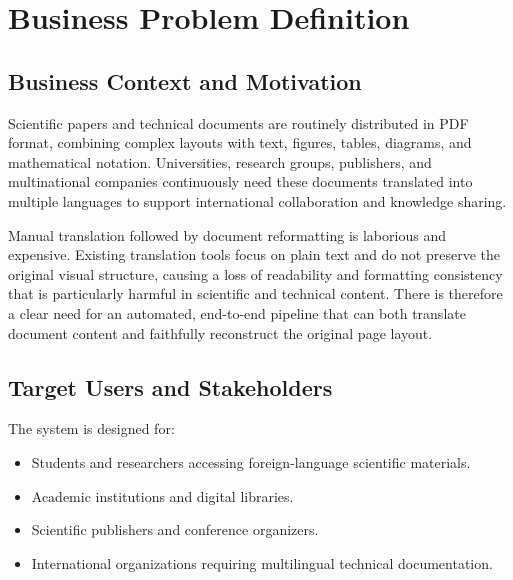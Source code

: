 \documentclass[12pt,a4paper]{article}
\begin{document}
\tableofcontents
\newpage

\section{Business Problem Definition}

\subsection{Business Context and Motivation}

Scientific papers and technical documents are routinely distributed in PDF format, combining complex layouts with text, figures, tables, diagrams, and mathematical notation. Universities, research groups, publishers, and multinational companies continuously need these documents translated into multiple languages to support international collaboration and knowledge sharing.

Manual translation followed by document reformatting is laborious and expensive. Existing translation tools focus on plain text and do not preserve the original visual structure, causing a loss of readability and formatting consistency that is particularly harmful in scientific and technical content. There is therefore a clear need for an automated, end-to-end pipeline that can both translate document content and faithfully reconstruct the original page layout.

\subsection{Target Users and Stakeholders}

The system is designed for:

\begin{itemize}
  \item Students and researchers accessing foreign-language scientific materials.
  \item Academic institutions and digital libraries.
  \item Scientific publishers and conference organizers.
  \item International organizations requiring multilingual technical documentation.
\end{itemize}
\end{document}
